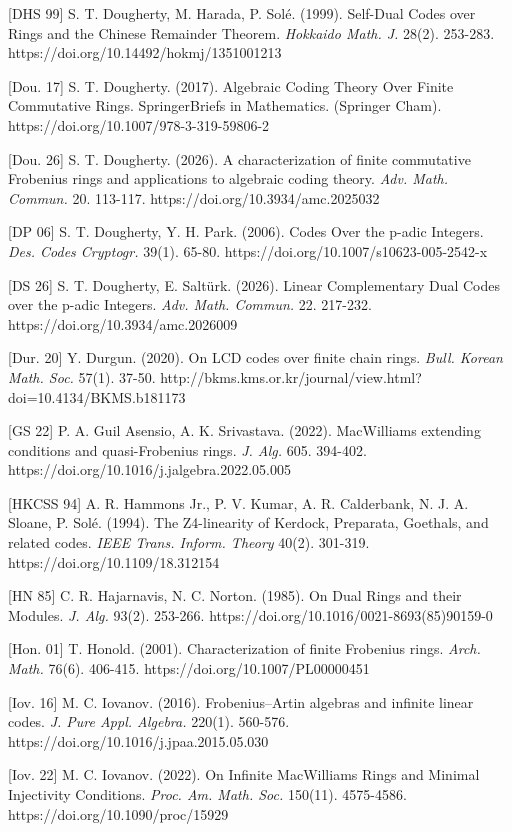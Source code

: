 \documentclass{article}
\theoremstyle{plain}
\theoremstyle{plain}
\theoremstyle{remark}
\theoremstyle{plain}
\begin{document}
[DHS 99] S. T. Dougherty, M. Harada, P. Solé. (1999). Self-Dual Codes over Rings and the Chinese Remainder Theorem. \textit{Hokkaido Math. J.} 28(2). 253-283. https://doi.org/10.14492/hokmj/1351001213


[Dou. 17]  S. T. Dougherty. (2017). Algebraic Coding Theory Over Finite Commutative Rings. SpringerBriefs in Mathematics. (Springer Cham). https://doi.org/10.1007/978-3-319-59806-2


[Dou. 26] S. T. Dougherty. (2026). A characterization of finite commutative Frobenius rings and applications to algebraic coding theory. \textit{Adv. Math. Commun.} 20. 113-117. https://doi.org/10.3934/amc.2025032

[DP 06] S. T. Dougherty, Y. H. Park. (2006). Codes Over the p-adic Integers. \textit{Des. Codes Cryptogr.} 39(1). 65-80. https://doi.org/10.1007/s10623-005-2542-x


[DS 26] S. T. Dougherty, E. Saltürk. (2026). Linear Complementary Dual Codes over the p-adic Integers. \textit{Adv. Math. Commun.} 22. 217-232. https://doi.org/10.3934/amc.2026009

[Dur. 20] Y. Durgun. (2020). On LCD codes over finite chain rings. \textit{Bull. Korean Math. Soc.} 57(1). 37-50. http://bkms.kms.or.kr/journal/view.html?doi=10.4134/BKMS.b181173

[GS 22] P. A. Guil Asensio, A. K. Srivastava. (2022). MacWilliams extending conditions and quasi-Frobenius rings. \textit{J. Alg.} 605. 394-402. https://doi.org/10.1016/j.jalgebra.2022.05.005

[HKCSS 94] A. R. Hammons Jr., P. V. Kumar, A. R. Calderbank, N. J. A. Sloane, P. Solé. (1994). The Z4-linearity of Kerdock, Preparata, Goethals, and related codes. \textit{IEEE Trans. Inform. Theory} 40(2). 301-319. https://doi.org/10.1109/18.312154

[HN 85] C. R. Hajarnavis, N. C. Norton. (1985). On Dual Rings and their Modules. \textit{J. Alg.} 93(2). 253-266. https://doi.org/10.1016/0021-8693(85)90159-0

[Hon. 01] T.  Honold. (2001). Characterization of finite Frobenius rings. \textit{Arch. Math.} 76(6). 406-415. https://doi.org/10.1007/PL00000451

[Iov. 16] M. C. Iovanov. (2016). Frobenius–Artin algebras and infinite linear codes. \textit{J. Pure Appl.
Algebra.}  220(1). 560-576. https://doi.org/10.1016/j.jpaa.2015.05.030

[Iov. 22] M. C. Iovanov. (2022). On Infinite MacWilliams Rings and Minimal Injectivity Conditions. \textit{Proc. Am. Math. Soc.} 150(11). 4575-4586. https://doi.org/10.1090/proc/15929
\end{document}
